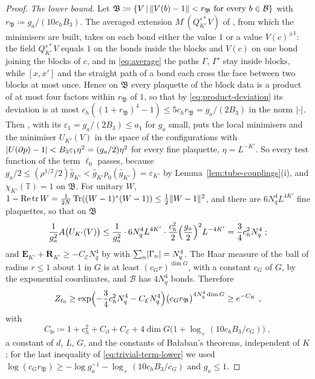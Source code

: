\documentclass[11pt]{preprint}
\newcommand{\tr}{\operatorname{tr}}
\DeclarePairedDelimiter{\abs}{\lvert}{\rvert}
\DeclarePairedDelimiter{\norm}{\lVert}{\rVert}
\numberwithin{equation}{section}
\theoremstyle{definition}
\theoremstyle{remark}
\theoremstyle{plain}
\begin{document}
\begin{proof}
\emph{The lower bound.} Let $\mathfrak B \coloneqq \{ V \,|\, \norm{V(b) - 1} < r_{\mathfrak B} \text{ for every } b \in \mathcal B \}$ with $r_{\mathfrak B} \coloneqq g_a/(10c_hB_3)$. The averaged extension $M^{\cdot}(Q^{s*}_{K'}V)$ of \cite[(2.16), p.~257]{BalabanCRE}, from which the minimisers are built, takes on each bond either the value $1$ or a value $V(c)^{\pm1}$: the field $Q^{s*}_{K'}V$ equals $1$ on the bonds inside the blocks and $V(c)$ on one bond joining the blocks of $c$, and in \eqref{eq:average} the paths $\Gamma$, $\Gamma'$ stay inside blocks, while $[x, x']$ and the straight path of a bond each cross the face between two blocks at most once. Hence on $\mathfrak B$ every plaquette of the block data is a product of at most four factors within $r_{\mathfrak B}$ of $1$, so that by \eqref{eq:product-deviation} its deviation is at most $c_h((1 + r_{\mathfrak B})^4 - 1) \leq 5c_hr_{\mathfrak B} = g_a/(2B_3)$ in the norm $\abs{\cdot}$. Then \cite[Theorem~1, p.~279]{BalabanVAR}, with its $\varepsilon_1 = g_a/(2B_3) \leq a_1$ for $g_a$ small, puts the local minimisers and the minimiser $U_{K'}(V)$ in the space of the configurations with $\abs{U(\partial p) - 1} < B_3\varepsilon_1\eta^2 = (g_a/2)\eta^2$ for every fine plaquette, $\eta = L^{-K'}$. So every test function of the term $\ell_0$ passes, because $g_a/2 \leq (\rho^{1/2}/2)\hat g_{K'} < \hat g_{K'}p_0(\hat g_{K'}) = \varepsilon_{K'}$ by Lemma~\ref{lem:tube-couplings}(i), and $\chi_{K'}(\mathbb T) = 1$ on $\mathfrak B$. For unitary $W$, $1 - \operatorname{Re}\tr W = \frac{1}{2N}\operatorname{Tr}((W - 1)^*(W - 1)) \leq \frac12\norm{W - 1}^2$, and there are $6N_q^4L^{4K'}$ fine plaquettes, so that on $\mathfrak B$
\begin{equation}\label{eq:trivial-term-action}
    \frac{1}{g_a^2}A\bigl(U_{K'}(V)\bigr) \leq \frac{1}{g_a^2}\cdot6N_q^4L^{4K'}\cdot\frac{c_h^2}{2}\Bigl(\frac{g_a}{2}\Bigr)^2L^{-4K'} = \frac34c_h^2N_q^4\;;
\end{equation}
and $\mathbf E_{K'} + \mathbf R_{K'} \geq -C_{\mathcal E}N_q^4$ by \cite[(2.45), (2.46)]{BalabanCRE} with $\sum_n\abs{\Gamma_n} = N_q^4$. The Haar measure of the ball of radius $r \leq 1$ about $1$ in $G$ is at least $(c_Gr)^{\dim G}$, with a constant $c_G$ of $G$, by the exponential coordinates, and $\mathcal B$ has $4N_q^4$ bonds. Therefore
\begin{equation}\label{eq:trivial-term-lower}
    Z_{\ell_0} \geq \exp\Bigl(-\frac34c_h^2N_q^4 - C_{\mathcal E}N_q^4\Bigr)\bigl(c_Gr_{\mathfrak B}\bigr)^{4N_q^4\dim G} \geq e^{-C_K}\;,
\end{equation}
with
\begin{equation}\label{eq:final-scale-constant}
    C_{\mathrm{fs}} \coloneqq 1 + c_h^2 + C_\partial + C_{\mathcal E} + 4\dim G\bigl(1 + \log_+(10c_hB_3/c_G)\bigr)\;,
\end{equation}
a constant of $d$, $L$, $G$, and the constants of Ba{\l}aban's theorems, independent of $K$; for the last inequality of \eqref{eq:trivial-term-lower} we used $\log(c_Gr_{\mathfrak B}) \geq -\log g_a^{-1} - \log_+(10c_hB_3/c_G)$ and $g_a \leq 1$.


\end{proof}
\end{document}
